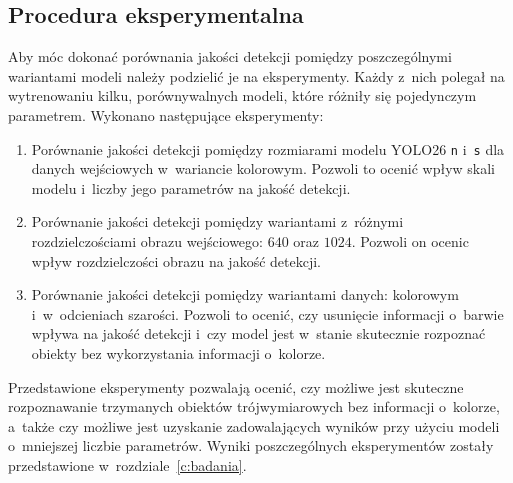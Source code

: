 \subsection{Procedura eksperymentalna}
\label{ssec:procedure}

Aby móc dokonać porównania jakości detekcji pomiędzy poszczególnymi wariantami modeli należy podzielić je na eksperymenty. Każdy z~nich polegał na wytrenowaniu kilku, porównywalnych modeli, które różniły się pojedynczym parametrem. Wykonano następujące eksperymenty:

\begin{enumerate}[label=\textbf{Eksperyment \Alph*:}, leftmargin=*, align=left]
    \item Porównanie jakości detekcji pomiędzy rozmiarami modelu YOLO26 \texttt{n} i~\texttt{s} dla danych wejściowych w~wariancie kolorowym. Pozwoli to ocenić wpływ skali modelu i~liczby jego parametrów na jakość detekcji.
    \item Porównanie jakości detekcji pomiędzy wariantami z~różnymi rozdzielczościami obrazu wejściowego: $640$ oraz $1024$. Pozwoli on ocenic wpływ rozdzielczości obrazu na jakość detekcji.
    \item Porównanie jakości detekcji pomiędzy wariantami danych: kolorowym i~w~odcieniach szarości. Pozwoli to ocenić, czy usunięcie informacji o~barwie wpływa na jakość detekcji i~czy model jest w~stanie skutecznie rozpoznać obiekty bez wykorzystania informacji o~kolorze.
\end{enumerate}

Przedstawione eksperymenty pozwalają ocenić, czy możliwe jest skuteczne rozpoznawanie trzymanych obiektów trójwymiarowych bez informacji o~kolorze, a~także czy możliwe jest uzyskanie zadowalających wyników przy użyciu modeli o~mniejszej liczbie parametrów. Wyniki poszczególnych eksperymentów zostały przedstawione w~rozdziale~\ref{c:badania}.
